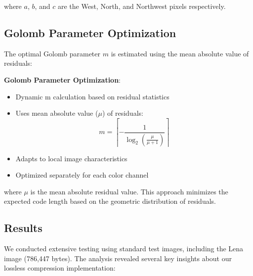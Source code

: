 \documentclass[a4paper,14pt]{article}
\begin{document}
where $a$, $b$, and $c$ are the West, North, and Northwest pixels respectively.

\subsection{Golomb Parameter Optimization}
The optimal Golomb parameter $m$ is estimated using the mean absolute value of residuals:

\textbf{Golomb Parameter Optimization}:
    \begin{itemize}
        \item Dynamic m calculation based on residual statistics
        \item Uses mean absolute value ($\mu$) of residuals:
        \begin{equation}
            m = \left\lceil -\frac{1}{\log_2(\frac{\mu}{\mu+1})} \right\rceil
        \end{equation}
        \item Adapts to local image characteristics
        \item Optimized separately for each color channel
    \end{itemize}


where $\mu$ is the mean absolute residual value. This approach minimizes the expected code length based on the geometric distribution of residuals.

\subsection{Results}
We conducted extensive testing using standard test images, including the Lena image (786,447 bytes). The analysis revealed several key insights about our lossless compression implementation:
\end{document}
